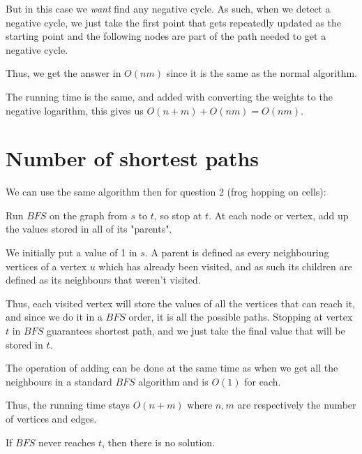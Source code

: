 \documentclass[11pt,letterpaper]{article}
\begin{document}
		But in this case we \textit{want} find any negative cycle.
		As such, when we detect a negative cycle, we just take the first point that gets repeatedly updated as the starting point and the following nodes are part of the path needed to get a negative cycle.
		
		Thus, we get the answer in $O(nm)$ since it is the same as the normal algorithm.
	
		The running time is the same, and added with converting the weights to the negative logarithm, this gives us $O(n+m) + O(nm) = O(nm)$.
	
	\section{Number of shortest paths}
		We can use the same algorithm then for question 2 (frog hopping on cells):
		
		Run $BFS$ on the graph from $s$ to $t$, so stop at $t$.
		At each node or vertex, add up the values stored in all of its "parents".
		
		We initially put a value of 1 in $s$.
		A parent is defined as every neighbouring vertices of a vertex $u$ which has already been visited, and as such its children are defined as its neighbours that weren't visited.
		
		Thus, each visited vertex will store the values of all the vertices that can reach it, and since we do it in a $BFS$ order, it is all the possible paths.
		Stopping at vertex $t$ in $BFS$ guarantees shortest path, and we just take the final value that will be stored in $t$.
		
		The operation of adding can be done at the same time as when we get all the neighbours in a standard $BFS$ algorithm and is $O(1)$ for each.
		
		Thus, the running time stays $O(n + m)$ where $n, m$ are respectively the number of vertices and edges.
		
		If $BFS$ never reaches $t$, then there is no solution.
	
\end{document}
